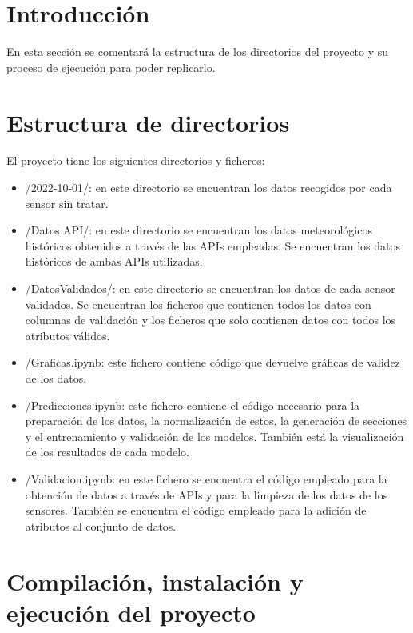  \label{Documentacion_programacion}

\section{Introducción}

En esta sección se comentará la estructura de los directorios del proyecto y su proceso de ejecución para poder replicarlo.

\section{Estructura de directorios}

El proyecto tiene los siguientes directorios y ficheros:

\begin{itemize}
    \item /2022-10-01/: en este directorio se encuentran los datos recogidos por cada sensor sin tratar.
    \item /Datos API/: en este directorio se encuentran los datos meteorológicos históricos obtenidos a través de las APIs empleadas. Se encuentran los datos históricos de ambas APIs utilizadas.
    \item /DatosValidados/: en este directorio se encuentran los datos de cada sensor validados. Se encuentran los ficheros que contienen todos los datos con columnas de validación y los ficheros que solo contienen datos con todos los atributos válidos.
    \item /Graficas.ipynb: este fichero contiene código que devuelve gráficas de validez de los datos.
    \item /Predicciones.ipynb: este fichero contiene el código necesario para la preparación de los datos, la normalización de estos, la generación de secciones y el entrenamiento y validación de los modelos. También está la visualización de los resultados de cada modelo.
    \item /Validacion.ipynb: en este fichero se encuentra el código empleado para la obtención de datos a través de APIs y para la limpieza de los datos de los sensores. También se encuentra el código empleado para la adición de atributos al conjunto de datos.
\end{itemize}

\section{Compilación, instalación y ejecución del proyecto}


